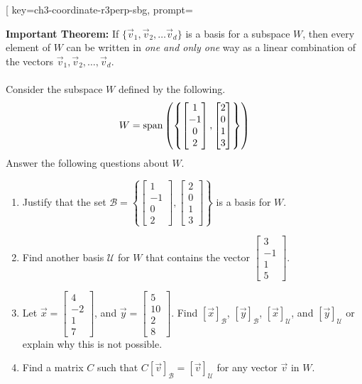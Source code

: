 
\begin{SaveQuestion}[
        key=ch3-coordinate-r3perp-sbg,
        prompt={\textbf{Important Theorem:}  If $\{\vec v_1, \vec v_2, \dots \vec v_d\} $  is a basis for a subspace $W$, then every element of $W$ can be written in \emph{one and only one} way as a linear combination of the vectors $\vec v_1, \vec v_2, \dots, \vec v_d$. \\ \\ Consider the subspace $W$ defined by the following. $$W =\operatorname{span}
        \left(\left\{\begin{bmatrix} 1 \\ -1 \\ 0 \\ 2 \end{bmatrix}, \begin{bmatrix} 2 \\ 0 \\ 1 \\ 3 \end{bmatrix}\right\}\right)$$ Answer the following questions about $W$. \begin{enumerate}\item Justify that the set $\mathcal B=\left\{\begin{bmatrix}1\\-1\\0\\2\end{bmatrix}, \begin{bmatrix}2\\0\\1\\3\end{bmatrix}\right\}$ is a basis for $W$.\item Find another basis $\mathcal U$ for $W$ that contains the vector $\begin{bmatrix} 3 \\ -1 \\ 1 \\ 5 \end{bmatrix}$. \item  Let $\vec x =\begin{bmatrix}4\\-2\\1\\7\end{bmatrix}$, and $\vec y=\begin{bmatrix}5\\10\\2\\8\end{bmatrix}$. Find $[\vec x]_{\mathcal B}$, $[\vec y]_{\mathcal B}$, $[\vec x]_{\mathcal U}$, and $[\vec y]_{\mathcal U}$ or explain why this is not possible. \item Find a matrix $C$ such that $C[\vec v]_\mathcal B=[\vec v]_{\mathcal U}$ for any vector $\vec v$ in $W$. \end{enumerate}}

\end{SaveQuestion}
